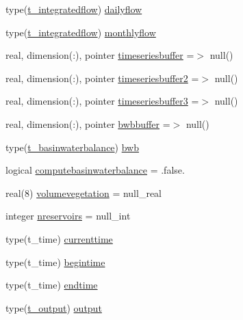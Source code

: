 \begin{DoxyCompactItemize}
\item 
type(\mbox{\hyperlink{structmodulebasin_1_1t__integratedflow}{t\+\_\+integratedflow}}) \mbox{\hyperlink{structmodulebasin_1_1t__basin_aa1138e40565ebc763a8c9115b7fb1a13}{dailyflow}}
\item 
type(\mbox{\hyperlink{structmodulebasin_1_1t__integratedflow}{t\+\_\+integratedflow}}) \mbox{\hyperlink{structmodulebasin_1_1t__basin_ac62f5e4dc473a5eda84feab9798f0839}{monthlyflow}}
\item 
real, dimension(\+:), pointer \mbox{\hyperlink{structmodulebasin_1_1t__basin_aec9a6512fbb34aea0abad418dcc4a5a6}{timeseriesbuffer}} =$>$ null()
\item 
real, dimension(\+:), pointer \mbox{\hyperlink{structmodulebasin_1_1t__basin_acd19910a126ccc24742e408e7c493cd5}{timeseriesbuffer2}} =$>$ null()
\item 
real, dimension(\+:), pointer \mbox{\hyperlink{structmodulebasin_1_1t__basin_a091d8b8ef6c71bead18e111ecd9179e1}{timeseriesbuffer3}} =$>$ null()
\item 
real, dimension(\+:), pointer \mbox{\hyperlink{structmodulebasin_1_1t__basin_a08dd1bbede5976309aafca1e3a8f0252}{bwbbuffer}} =$>$ null()
\item 
type(\mbox{\hyperlink{structmodulebasin_1_1t__basinwaterbalance}{t\+\_\+basinwaterbalance}}) \mbox{\hyperlink{structmodulebasin_1_1t__basin_a0ef247466a3b4f972e5ddd715728f6ca}{bwb}}
\item 
logical \mbox{\hyperlink{structmodulebasin_1_1t__basin_a92144d4244a82048192a7e52b3f4e26b}{computebasinwaterbalance}} = .false.
\item 
real(8) \mbox{\hyperlink{structmodulebasin_1_1t__basin_ab0f7baa94487f53036c6c6bf7939a0a5}{volumevegetation}} = null\+\_\+real
\item 
integer \mbox{\hyperlink{structmodulebasin_1_1t__basin_a7311776e335b5ffb5f8dcc6260ddacc0}{nreservoirs}} = null\+\_\+int
\item 
type(t\+\_\+time) \mbox{\hyperlink{structmodulebasin_1_1t__basin_a92f5e11cccbc6e8d3190874335095da8}{currenttime}}
\item 
type(t\+\_\+time) \mbox{\hyperlink{structmodulebasin_1_1t__basin_a6a394b36a013053352c6ad01ee7ed8aa}{begintime}}
\item 
type(t\+\_\+time) \mbox{\hyperlink{structmodulebasin_1_1t__basin_ade8be754ad0264e5c92d1e390be6c91c}{endtime}}
\item 
type(\mbox{\hyperlink{structmodulebasin_1_1t__output}{t\+\_\+output}}) \mbox{\hyperlink{structmodulebasin_1_1t__basin_a36fd1fb1f0bc8ac4dcc8eded6e3e193a}{output}}

\end{DoxyCompactItemize}
